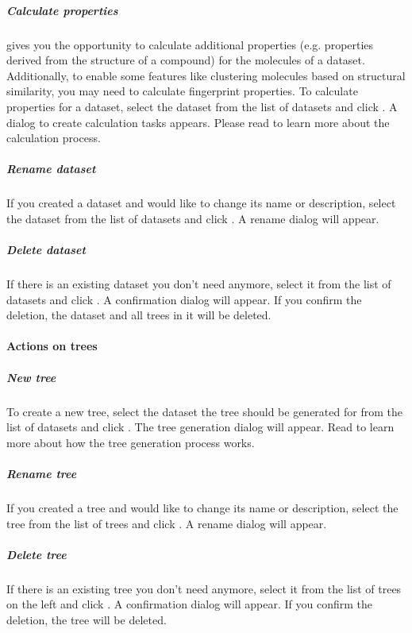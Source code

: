 
	
\subparagraph*{Calculate properties}
\sh gives you the opportunity to calculate additional properties (e.g. properties derived from the structure of a compound) for the molecules of a dataset.
Additionally, to enable some features like clustering molecules based on structural similarity, you may need to calculate fingerprint properties.
To calculate properties for a dataset, select the dataset from the list of datasets and click .
A dialog to create calculation tasks appears. Please read  to learn more about the calculation process.

\subparagraph*{Rename dataset}
If you created a dataset and would like to change its name or description, select the dataset from the list of datasets and click .
A rename dialog will appear.

\subparagraph*{Delete dataset}
If there is an existing dataset you don't need anymore, select it from the list of datasets and click .
A confirmation dialog will appear. If you confirm the deletion, the dataset and all trees in it will be deleted.


\paragraph*{Actions on trees}

\subparagraph*{New tree}
To create a new tree, select the dataset the tree should be generated for from the list of datasets and click .
The tree generation dialog will appear. Read  to learn more about how the tree generation process works.

\subparagraph*{Rename tree}
If you created a tree and would like to change its name or description, select the tree from the list of trees and click .
A rename dialog will appear.

\subparagraph*{Delete tree}
If there is an existing tree you don't need anymore, select it from the list of trees on the left and click .
A confirmation dialog will appear. If you confirm the deletion, the tree will be deleted.

